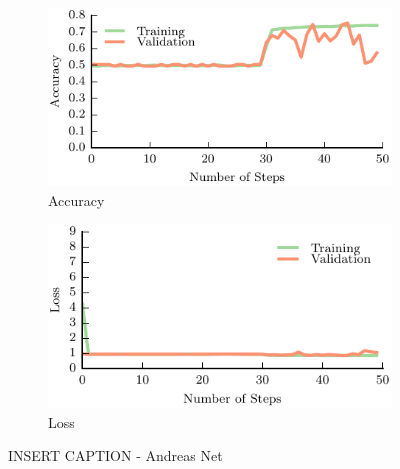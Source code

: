 \begin{figure}[t!]
    \centering
    \begin{subfigure}[t]{0.49\textwidth}
        \includegraphics[width=0.9\columnwidth]{figs/andreas_accuracy.pdf}
        \caption{Accuracy} \label{fig:accuracy}
        \end{subfigure}
    \begin{subfigure}[t]{0.49\textwidth}
        \includegraphics[width=0.9\columnwidth]{figs/andreas_loss.pdf}
        \caption{Loss} \label{fig:loss}
    \end{subfigure}
\caption{INSERT CAPTION - Andreas Net} \label{fig:andreas_results}
\end{figure}